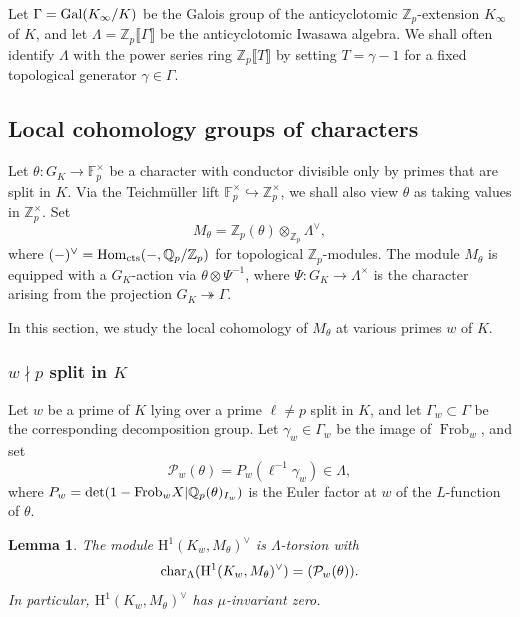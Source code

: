 \documentclass[10pt]{amsart}
\numberwithin{equation}{section}
\newtheorem{lemma}[theorem]{Lemma}
\theoremstyle{definition}
\theoremstyle{remark}
\newcommand{\Z}{\mathbb{Z}}
\newcommand{\bZ}{\mathbb{Z}}
\newcommand{\bQ}{\mathbb{Q}}
\newcommand{\rH}{\mathrm{H}}
\DeclareMathOperator{\Frob}{Frob}
\begin{document}
Let $\Gamma={\rm Gal}(K_\infty/K)$ be the Galois group of the anticyclotomic $\Z_p$-extension $K_\infty$ of $K$, and 
let $\Lambda=\Z_p\llbracket\Gamma\rrbracket$ be the anticyclotomic Iwasawa algebra. We shall often identify $\Lambda$ with the power series ring $\bZ_p\llbracket T\rrbracket$ by setting $T=\gamma-1$ for a fixed topological generator $\gamma\in\Gamma$.


\subsection{Local cohomology groups of characters}\label{localchar}


Let  $\theta:G_K\rightarrow\mathbb{F}_p^\times$  
be a character with conductor divisible only by primes that are split in $K$. Via the Teichm\"uller lift $\mathbb{F}_p^\times\hookrightarrow\Z_p^\times$, we shall also view $\theta$ as taking values in $\Z_p^\times$. Set
\[
M_\theta=\Z_p(\theta)\otimes_{\Z_p}\Lambda^\vee,
\]
where $(-)^\vee = {\rm Hom}_{\rm cts}(-,\bQ_p/\bZ_p)$ for topological $\Z_p$-modules. The module $M_\theta$ is equipped with a $G_K$-action via $\theta\otimes\Psi^{-1}$, where $\Psi:G_K\rightarrow\Lambda^\times$ is the character arising from the projection $G_K\twoheadrightarrow\Gamma$.

In this section, we study the local cohomology of $M_\theta$ at various primes $w$ of $K$. 

\subsubsection{$w\nmid p$ split in $K$}

Let $w$ be a prime of $K$ lying over a prime $\ell\neq p$ split in $K$, and let $\Gamma_w\subset \Gamma$ be the corresponding decomposition group. Let $\gamma_w\in\Gamma_w$ be 
the image of $\Frob_w$, and set
\begin{equation}\label{eq:Euler}
\mathcal{P}_w(\theta)=P_w(\ell^{-1}\gamma_w)
\in\Lambda,
\end{equation}
where $P_w={\rm det}(1-{\rm Frob}_wX\vert\bQ_p(\theta)_{I_w})$ is the Euler factor at $w$ of the $L$-function of $\theta$.
 
\begin{lemma}\label{lemmawneqp} 
The module $\rH^1(K_w,M_\theta)^\vee$ is $\Lambda$-torsion with
\[
{\rm char}_\Lambda(\rH^1(K_w,M_\theta)^\vee)=(\mathcal{P}_w(\theta)).
\]
In particular, $\rH^1(K_w,M_\theta)^\vee$ has $\mu$-invariant zero.
\end{lemma}
\end{document}

